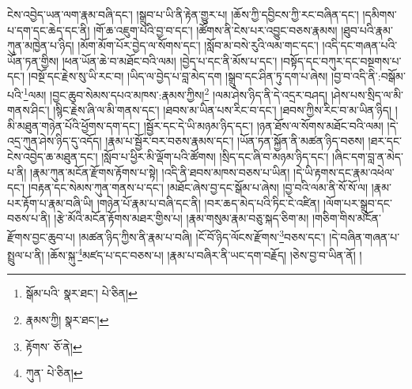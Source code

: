 ངེས་འབྱེད་ཡན་ལག་རྣམ་བཞི་དང་། །སྒྲུབ་པ་ཡི་ནི་རྟེན་གྱུར་པ། །ཆོས་ཀྱི་དབྱིངས་ཀྱི་རང་བཞིན་དང་། །དམིགས་པ་དག་དང་ཆེད་དང་ནི། །གོ་ཆ་འཇུག་པའི་བྱ་བ་དང་། །ཚོགས་ནི་ངེས་པར་འབྱུང་བཅས་རྣམས། །ཐུབ་པའི་རྣམ་ཀུན་མཁྱེན་པ་ཉིད། །མོག་མོག་པོར་བྱེད་ལ་སོགས་དང་། །སློབ་མ་བསེ་རུའི་ལམ་གང་དང་། །འདི་དང་གཞན་པའི་ཡོན་ཏན་གྱིས། །ཕན་ཡོན་ཆེ་བ་མཐོང་བའི་ལམ། །བྱེད་པ་དང་ནི་མོས་པ་དང་། །བསྟོད་དང་བཀུར་དང་བསྔགས་པ་དང་། །བསྔོ་དང་རྗེས་སུ་ཡི་རང་བ། །ཡིད་ལ་བྱེད་པ་བླ་མེད་དག །སྒྲུབ་དང་ཤིན་ཏུ་དག་པ་ཞེས། །བྱ་བ་འདི་ནི་:བསྒོམ་པའི་\footnote{སྒོམ་པའི་  སྣར་ཐང་།  པེ་ཅིན། }ལམ། །བྱང་ཆུབ་སེམས་དཔའ་མཁས་:རྣམས་ཀྱིས།\footnote{རྣམས་ཀྱི།  སྣར་ཐང་། } །ལམ་ཤེས་ཉིད་ནི་དེ་འདྲར་བཤད། །ཤེས་པས་སྲིད་ལ་མི་གནས་ཤིང་། །སྙིང་རྗེས་ཞི་ལ་མི་གནས་དང་། །ཐབས་མ་ཡིན་པས་རིང་བ་དང་། །ཐབས་ཀྱིས་རིང་བ་མ་ཡིན་ཉིད། །མི་མཐུན་གཉེན་པོའི་ཕྱོགས་དག་དང་། །སྦྱོར་དང་དེ་ཡི་མཉམ་ཉིད་དང་། །ཉན་ཐོས་ལ་སོགས་མཐོང་བའི་ལམ། །དེ་འདྲ་ཀུན་ཤེས་ཉིད་དུ་འདོད། །རྣམ་པ་སྦྱོར་བར་བཅས་རྣམས་དང་། །ཡོན་ཏན་སྐྱོན་ནི་མཚན་ཉིད་བཅས། །ཐར་དང་ངེས་འབྱེད་ཆ་མཐུན་དང་། །སློབ་པ་ཕྱིར་མི་ལྡོག་པའི་ཚོགས། །སྲིད་དང་ཞི་བ་མཉམ་ཉིད་དང་། །ཞིང་དག་བླ་ན་མེད་པ་ནི། །རྣམ་ཀུན་མངོན་རྫོགས་རྟོགས་པ་སྟེ། །འདི་ནི་ཐབས་མཁས་བཅས་པ་ཡིན། །དེ་ཡི་རྟགས་དང་རྣམ་འཕེལ་དང་། །བརྟན་དང་སེམས་ཀུན་གནས་པ་དང་། །མཐོང་ཞེས་བྱ་དང་སྒོམ་པ་ཞེས། །བྱ་བའི་ལམ་ནི་སོ་སོ་ལ། །རྣམ་པར་རྟོག་པ་རྣམ་བཞི་ཡི། །གཉེན་པོ་རྣམ་པ་བཞི་དང་ནི། །བར་ཆད་མེད་པའི་ཏིང་ངེ་འཛིན། །ལོག་པར་སྒྲུབ་དང་བཅས་པ་ནི། །རྩེ་མོའི་མངོན་རྟོགས་མཐར་གྱིས་པ། །རྣམ་གསུམ་རྣམ་བཅུ་སྐད་ཅིག་མ། །གཅིག་གིས་མངོན་རྫོགས་བྱང་ཆུབ་པ། །མཚན་ཉིད་ཀྱིས་ནི་རྣམ་པ་བཞི། །ངོ་བོ་ཉིད་ལོངས་རྫོགས་\footnote{རྟོགས་  ཅོ་ནེ། }བཅས་དང་། །དེ་བཞིན་གཞན་པ་སྤྲུལ་པ་ནི། །ཆོས་སྐུ་\footnote{ཀུན་  པེ་ཅིན། }མཛད་པ་དང་བཅས་པ། །རྣམ་པ་བཞིར་ནི་ཡང་དག་བརྗོད། །ཅེས་བྱ་བ་ཡིན་ནོ། །
